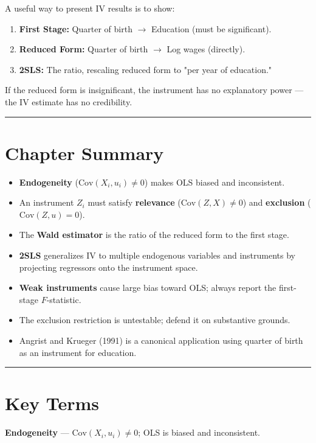 A useful way to present IV results is to show:

\begin{enumerate}
\item \textbf{First Stage:} Quarter of birth $\to$ Education (must be significant).
\item \textbf{Reduced Form:} Quarter of birth $\to$ Log wages (directly).
\item \textbf{2SLS:} The ratio, rescaling reduced form to "per year of education."
\end{enumerate}

If the reduced form is insignificant, the instrument has no explanatory power --- the IV estimate has no credibility.

\medskip\hrule\medskip

\section{Chapter Summary}

\begin{itemize}
\item \textbf{Endogeneity} ($\text{Cov}(X_i, u_i) \neq 0$) makes OLS biased and inconsistent.
\item An instrument $Z_i$ must satisfy \textbf{relevance} ($\text{Cov}(Z, X) \neq 0$) and \textbf{exclusion} ($\text{Cov}(Z, u) = 0$).
\item The \textbf{Wald estimator} is the ratio of the reduced form to the first stage.
\item \textbf{2SLS} generalizes IV to multiple endogenous variables and instruments by projecting regressors onto the instrument space.
\item \textbf{Weak instruments} cause large bias toward OLS; always report the first-stage $F$-statistic.
\item The exclusion restriction is untestable; defend it on substantive grounds.
\item Angrist and Krueger (1991) is a canonical application using quarter of birth as an instrument for education.
\end{itemize}

\medskip\hrule\medskip

\section{Key Terms}

\textbf{Endogeneity} --- $\text{Cov}(X_i, u_i) \neq 0$; OLS is biased and inconsistent.

